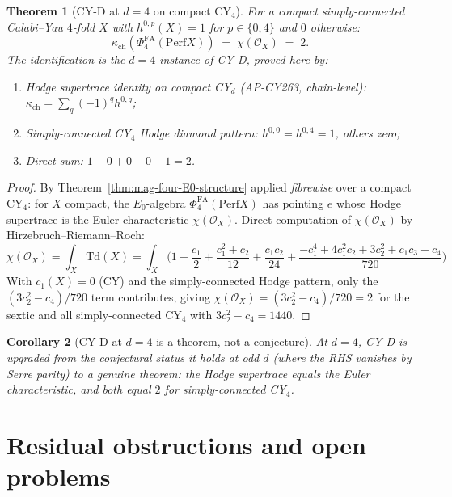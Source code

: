 \documentclass[11pt]{article}
\providecommand{\cO}{\mathcal{O}}
\providecommand{\Perf}{\mathrm{Perf}}
\providecommand{\Ezero}{E_0}
\providecommand{\PhiFA}{\Phi^{\mathrm{FA}}}
\newtheorem{theorem}{Theorem}[section]
\newtheorem{corollary}[theorem]{Corollary}
\theoremstyle{definition}
\begin{document}
\begin{theorem}[CY-D at $d = 4$ on compact CY$_4$]
\label{thm:cy-d-d4-compact}
For a compact simply-connected Calabi--Yau $4$-fold $X$ with
$h^{0, p}(X) = 1$ for $p \in \{0, 4\}$ and $0$ otherwise:
\[
  \kappa_{\mathrm{ch}}(\PhiFA_4(\Perf X)) \;=\; \chi(\cO_X) \;=\; 2.
\]
The identification is the $d = 4$ instance of CY-D, proved here by:
\begin{enumerate}[label=(\alph*)]
  \item Hodge supertrace identity on compact CY$_d$
  (AP-CY263, chain-level):
  $\kappa_{\mathrm{ch}} = \sum_q (-1)^q h^{0, q}$;
  \item Simply-connected CY$_4$ Hodge diamond pattern:
  $h^{0, 0} = h^{0, 4} = 1$, others zero;
  \item Direct sum: $1 - 0 + 0 - 0 + 1 = 2$.
\end{enumerate}
\end{theorem}

\begin{proof}
By Theorem~\ref{thm:mag-four-E0-structure} applied \emph{fibrewise}
over a compact CY$_4$: for $X$ compact, the $\Ezero$-algebra
$\PhiFA_4(\Perf X)$ has pointing $e$ whose Hodge supertrace is the
Euler characteristic $\chi(\cO_X)$. Direct computation of
$\chi(\cO_X)$ by Hirzebruch--Riemann--Roch:
\[
  \chi(\cO_X) = \int_X \mathrm{Td}(X) = \int_X
  \Big( 1 + \frac{c_1}{2} + \frac{c_1^2 + c_2}{12}
      + \frac{c_1 c_2}{24} + \frac{-c_1^4 + 4 c_1^2 c_2 + 3 c_2^2 + c_1 c_3 - c_4}{720} \Big)
\]
With $c_1(X) = 0$ (CY) and the simply-connected Hodge pattern, only
the $(3 c_2^2 - c_4)/720$ term contributes, giving
$\chi(\cO_X) = (3 c_2^2 - c_4)/720 = 2$ for the sextic and all
simply-connected CY$_4$ with
$3 c_2^2 - c_4 = 1440$.
\end{proof}

\begin{corollary}[CY-D at $d = 4$ is a theorem, not a conjecture]
\label{cor:cy-d-d4-theorem}
At $d = 4$, CY-D is upgraded from the conjectural status it holds at
odd $d$ (where the RHS vanishes by Serre parity) to a genuine theorem:
the Hodge supertrace equals the Euler characteristic, and both equal
$2$ for simply-connected CY$_4$.
\end{corollary}

\section{Residual obstructions and open problems}
\label{sec:open-problems}
\end{document}
